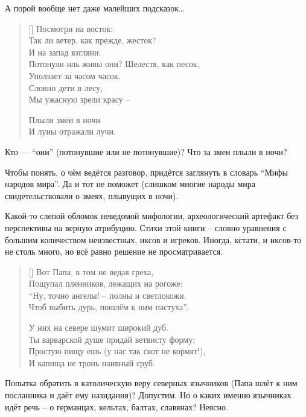 \documentclass[12pt,a5paper,twoside]{article}
\begin{document}
А порой вообще нет даже малейших подсказок…

\settowidth{\versewidth}{Посмотри на восток:}
\begin{verse}[\versewidth]
Посмотри на восток:\\
Так ли ветер, как прежде, жесток?\\
И на запад взгляни:\\
Потонули иль живы они?
\newpage
Шелестя, как песок,\\
Уползает за часом часок.\\
Словно дети в лесу,\\
Мы ужасную зрели красу --

Плыли змеи в ночи\\
И луны отражали лучи.
\end{verse}

Кто --- ``они'' (потонувшие или не потонувшие)? Что за змеи плыли в ночи?

Чтобы понять, о чём ведётся разговор, придётся заглянуть в словарь ``Мифы народов мира''. 
Да и тот не поможет (слишком многие народы мира свидетельствовали о змеях, плывущих в ночи).

Какой-то слепой обломок неведомой мифологии, археологический артефакт без перспективы 
на верную атрибуцию.
 Стихи этой книги -- словно уравнения с большим количеством 
неизвестных, иксов и игреков. Иногда, кстати, и иксов-то не столь много, но всё равно решение не просматривается.

\settowidth{\versewidth}{Вот Папа, в том не ведая греха,}
\begin{verse}[\versewidth]
Вот Папа, в том не ведая греха,\\
Пощупал пленников, лежащих на рогоже:\\
``Ну, точно ангелы! -- полны и светлокожи.\\
Чтоб выбить дурь, пошлём к ним пастуха''.

У них на севере шумит широкий дуб.\\
Ты варварской душе придай ветвисту форму;\\
Простую пищу ешь (у нас так скот не кормят!),\\
И капища не тронь наивный сруб.
\end{verse}

Попытка обратить в католическую веру северных язычников 
(Папа шлёт к ним посланника и даёт ему назидания)? Допустим. 
Но о каких именно язычниках идёт речь -- о германцах, кельтах, балтах, славянах? Неясно.
\end{document}
